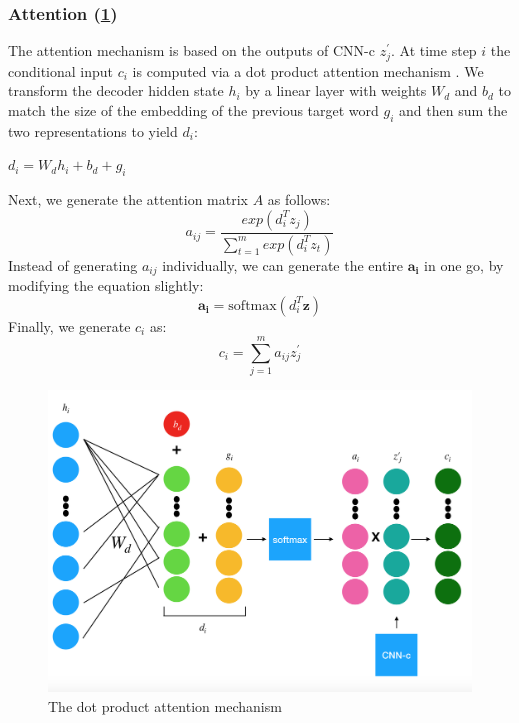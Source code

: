 \documentclass{article}
\begin{document}
\begin{flushleft}

\subsubsection{Attention (\ref{fig:att})}
The attention mechanism is based on the outputs of CNN-c $z^{\prime}_j$. At time step $i$ the conditional input $c_i$ is computed via a dot product attention mechanism \cite{luong2015effective}. We transform the decoder hidden state $h_i$ by a linear layer with weights $W_d$ and $b_d$ to match the size of the embedding of the previous target word $g_i$ and then sum the two representations to yield $d_i$:
\begin{center}
$d_i=W_dh_{i}+b_d+g_i$
\end{center}
Next, we generate the attention matrix $A$ as follows:
$$a_{ij} = \frac{exp \left(d_i^Tz_j\right)}{\sum^m_{t=1}exp\left(d_i^Tz_t\right)}$$
Instead of generating $a_{ij}$ individually, we can generate the entire $\mathbf{a_i}$ in one go, by modifying the equation slightly:
$$\mathbf{a_i} = \text{softmax}(d_i^T\mathbf{z})$$
Finally, we generate $c_i$ as:
$$c_i = \sum_{j=1}^{m}a_{ij}z^{\prime}_{j}$$

\begin{figure}[h]
    \centering
	\captionsetup{justification=centering,margin=2cm}
    \includegraphics[scale=0.25]{Attention}
    \caption{The dot product attention mechanism}
    \label{fig:att}
\end{figure}


\end{flushleft}
\end{document}
